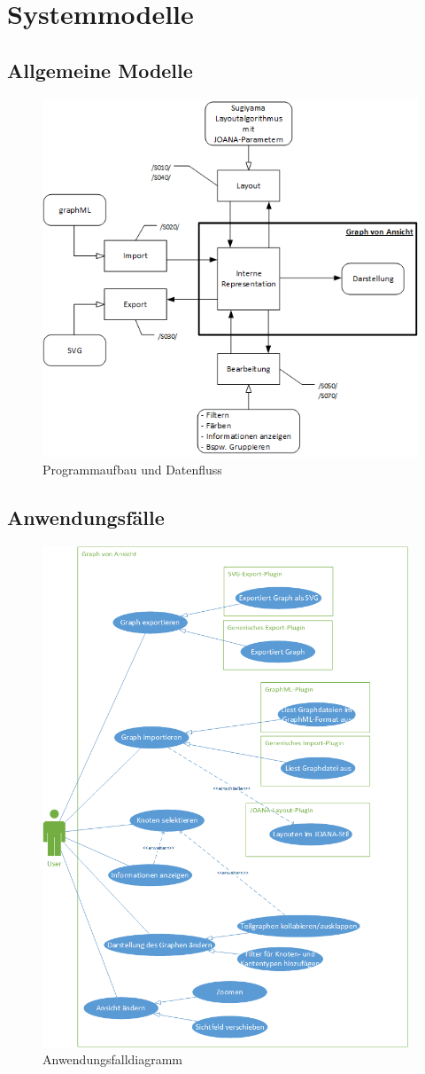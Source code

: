 \chapter{Systemmodelle}
\label{ch:sysmodel}

\section{Allgemeine Modelle}
\begin{figure}[ht]
	\centering
	\includegraphics[width=360pt]{resourcen/plugin.png}
	\caption{Programmaufbau und Datenfluss}
	\label{fig:aufbaudatenfluss}
\end{figure}
\newpage
\section{Anwendungsfälle}
\begin{figure}[ht]
	\centering
	\includegraphics[width=310pt]{resourcen/usecase.png}
	\caption{Anwendungsfalldiagramm}
	\label{fig:usecase}
\end{figure}